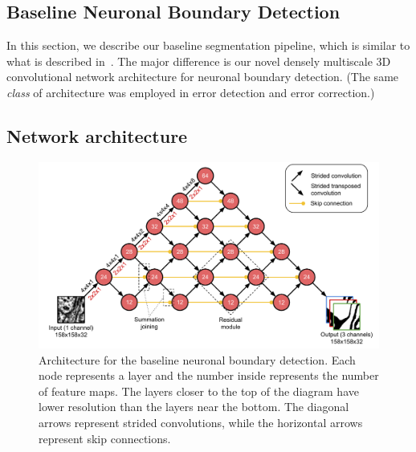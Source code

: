 \documentclass{article}
\begin{document}
\begin{appendices}

\section{Baseline Neuronal Boundary Detection}
\label{appendix:baseline}

In this section, we describe our baseline segmentation pipeline, which is
similar to what is described in~\cite{kisuk}. The major difference is our novel
densely multiscale 3D convolutional network architecture for neuronal boundary
detection. (The same \emph{class} of architecture was employed in error
detection and error correction.)

\subsection{Network architecture}

\begin{figure}[!b]
\centering
\includegraphics[width=1.0\linewidth]{baseline.pdf}
\caption{Architecture for the baseline neuronal boundary detection. Each node represents a layer and the number inside represents the number of feature maps. The layers closer to the top of the diagram have lower resolution than the layers near the bottom. The diagonal arrows represent strided convolutions, while the horizontal arrows represent skip connections.}
\label{fig:boundary_detector}
\end{figure}


\end{appendices}
\end{document}
